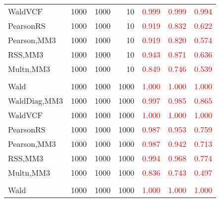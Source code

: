 \documentclass[
]{article}
\begin{document}
\begin{table}[H]
{\begin{tabular}[t]{lrrrrrr}
\hspace{1em}WaldVCF & 1000 & 1000 & 10 & \textcolor{red}{0.999} & \textcolor{red}{0.999} & \textcolor{red}{0.994}\\
\hspace{1em}PearsonRS & 1000 & 1000 & 10 & \textcolor{red}{0.919} & \textcolor{red}{0.832} & \textcolor{red}{0.622}\\
\hspace{1em}Pearson,MM3 & 1000 & 1000 & 10 & \textcolor{red}{0.919} & \textcolor{red}{0.820} & \textcolor{red}{0.574}\\
\hspace{1em}RSS,MM3 & 1000 & 1000 & 10 & \textcolor{red}{0.943} & \textcolor{red}{0.871} & \textcolor{red}{0.636}\\
\hspace{1em}Multn,MM3 & 1000 & 1000 & 10 & \textcolor{red}{0.849} & \textcolor{red}{0.746} & \textcolor{red}{0.539}\\
\addlinespace[0.3em]
\multicolumn{7}{l}{\textbf{1F 15V}}\\
\hspace{1em}Wald & 1000 & 1000 & 1000 & \textcolor{red}{1.000} & \textcolor{red}{1.000} & \vphantom{2} \textcolor{red}{1.000}\\
\hspace{1em}WaldDiag,MM3 & 1000 & 1000 & 1000 & \textcolor{red}{0.997} & \textcolor{red}{0.985} & \textcolor{red}{0.865}\\
\hspace{1em}WaldVCF & 1000 & 1000 & 1000 & \textcolor{red}{1.000} & \textcolor{red}{1.000} & \textcolor{red}{1.000}\\
\hspace{1em}PearsonRS & 1000 & 1000 & 1000 & \textcolor{red}{0.987} & \textcolor{red}{0.953} & \textcolor{red}{0.759}\\
\hspace{1em}Pearson,MM3 & 1000 & 1000 & 1000 & \textcolor{red}{0.987} & \textcolor{red}{0.942} & \textcolor{red}{0.713}\\
\hspace{1em}RSS,MM3 & 1000 & 1000 & 1000 & \textcolor{red}{0.994} & \textcolor{red}{0.968} & \textcolor{red}{0.774}\\
\hspace{1em}Multn,MM3 & 1000 & 1000 & 1000 & \textcolor{red}{0.836} & \textcolor{red}{0.743} & \textcolor{red}{0.497}\\
\addlinespace[0.3em]
\multicolumn{7}{l}{\textbf{2F 10V}}\\
\hspace{1em}Wald & 1000 & 1000 & 1000 & \textcolor{red}{1.000} & \textcolor{red}{1.000} & \vphantom{1} \textcolor{red}{1.000}\\

\end{tabular}}
\end{table}
\end{document}
